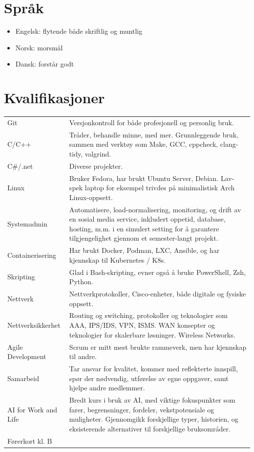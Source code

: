 \documentclass[a4paper,12pt]{article}
\begin{document}
\section{Språk}
\begin{itemize}
    \item Engelsk: flytende både skriftlig og muntlig
    \item Norsk: morsmål
    \item Dansk: forstår godt
\end{itemize}

\section{Kvalifikasjoner}
\begin{tabularx}{\linewidth}{@{}l X@{}}
Git &  \normalsize{Versjonkontroll for både profesjonell og personlig bruk.}\\
C/C++ &    \normalsize{Tråder, behandle minne, med mer. Grunnleggende bruk, sammen med verktøy som Make, GCC, cppcheck, clang-tidy, valgrind.}\\ 
C\#/.net  &  \normalsize{Diverse projekter.}\\ 
Linux &  \normalsize{Bruker Fedora, har brukt Ubuntu Server, Debian. Lav-spek laptop for eksempel trivdes på minimalistisk Arch Linux-oppsett.}\\
Systemadmin &  \normalsize{Automatisere, load-normalisering, monitoring, og drift av en sosial media service, inkludert oppetid, database, hosting, m.m. i en simulert setting for å garantere tilgjengelighet gjennom et semester-langt projekt.}\\
Containerisering &  \normalsize{Har brukt Docker, Podman, LXC, Ansible, og har kjennskap til Kubernetes / K8s.}\\
Skripting   &   \normalsize{Glad i Bash-skripting, evner også å bruke PowerShell, Zsh, Python.}\\
Nettverk &  \normalsize{Nettverkprotokoller, Cisco-enheter, både digitale og fysiske oppsett.}\\
Nettverksikkerhet &  \normalsize{Routing og switching, protokoller og teknologier som AAA, IPS/IDS, VPN, ISMS. WAN konsepter og teknologier for skalerbare løsninger. Wireless Networks.}\\
Agile Development &  \normalsize{Scrum er mitt mest brukte rammeverk, men har kjennskap til andre.}\\ 
Samarbeid &    \normalsize{Tar ansvar for kvalitet, kommer med reflekterte innspill, spør der nødvendig, utførelse av egne oppgaver, samt hjelpe andre medlemmer.}\\
AI for Work and Life & \normalsize{Bredt kurs i bruk av AI, med viktige fokuspunkter som farer, begrensninger, fordeler, vekstpotensiale og muligheter. Gjennomgikk forskjellige typer, historien, og eksisterende alternativer til forskjellige bruksområder.} \\
Førerkort kl. B & \\
\end{tabularx}



\vfill

\end{document}
